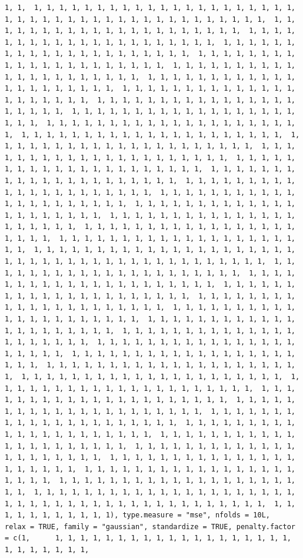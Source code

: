 \documentclass[
]{article}
\begin{document}
\begin{verbatim}
1, 1,  1, 1, 1, 1, 1, 1, 1, 1, 1, 1, 1, 1, 1, 1, 1, 1, 1, 1, 1, 1, 1,  1, 1, 1, 1, 1, 1, 1, 1, 1, 1, 1, 1, 1, 1, 1, 1, 1, 1, 1, 1, 1,  1, 1, 1, 1, 1, 1, 1, 1, 1, 1, 1, 1, 1, 1, 1, 1, 1, 1, 1, 1, 1,  1, 1, 1, 1, 1, 1, 1, 1, 1, 1, 1, 1, 1, 1, 1, 1, 1, 1, 1, 1, 1,  1, 1, 1, 1, 1, 1, 1, 1, 1, 1, 1, 1, 1, 1, 1, 1, 1, 1, 1, 1, 1,  1, 1, 1, 1, 1, 1, 1, 1, 1, 1, 1, 1, 1, 1, 1, 1, 1, 1, 1, 1, 1,  1, 1, 1, 1, 1, 1, 1, 1, 1, 1, 1, 1, 1, 1, 1, 1, 1, 1, 1, 1, 1,  1, 1, 1, 1, 1, 1, 1, 1, 1, 1, 1, 1, 1, 1, 1, 1, 1, 1, 1, 1, 1,  1, 1, 1, 1, 1, 1, 1, 1, 1, 1, 1, 1, 1, 1, 1, 1, 1, 1, 1, 1, 1,  1, 1, 1, 1, 1, 1, 1, 1, 1, 1, 1, 1, 1, 1, 1, 1, 1, 1, 1, 1, 1,  1, 1, 1, 1, 1, 1, 1, 1, 1, 1, 1, 1, 1, 1, 1, 1, 1, 1, 1, 1, 1,  1, 1, 1, 1, 1, 1, 1, 1, 1, 1, 1, 1, 1, 1, 1, 1, 1, 1, 1, 1, 1,  1, 1, 1, 1, 1, 1, 1, 1, 1, 1, 1, 1, 1, 1, 1, 1, 1, 1, 1, 1, 1,  1, 1, 1, 1, 1, 1, 1, 1, 1, 1, 1, 1, 1, 1, 1, 1, 1, 1, 1, 1, 1,  1, 1, 1, 1, 1, 1, 1, 1, 1, 1, 1, 1, 1, 1, 1, 1, 1, 1, 1, 1, 1,  1, 1, 1, 1, 1, 1, 1, 1, 1, 1, 1, 1, 1, 1, 1, 1, 1, 1, 1, 1, 1,  1, 1, 1, 1, 1, 1, 1, 1, 1, 1, 1, 1, 1, 1, 1, 1, 1, 1, 1, 1, 1,  1, 1, 1, 1, 1, 1, 1, 1, 1, 1, 1, 1, 1, 1, 1, 1, 1, 1, 1, 1, 1,  1, 1, 1, 1, 1, 1, 1, 1, 1, 1, 1, 1, 1, 1, 1, 1, 1, 1, 1, 1, 1,  1, 1, 1, 1, 1, 1, 1, 1, 1, 1, 1, 1, 1, 1, 1, 1, 1, 1, 1, 1, 1,  1, 1, 1, 1, 1, 1, 1, 1, 1, 1, 1, 1, 1, 1, 1, 1, 1, 1, 1, 1, 1,  1, 1, 1, 1, 1, 1, 1, 1, 1, 1, 1, 1, 1, 1, 1, 1, 1, 1, 1, 1, 1,  1, 1, 1, 1, 1, 1, 1, 1, 1, 1, 1, 1, 1, 1, 1, 1, 1, 1, 1, 1, 1,  1, 1, 1, 1, 1, 1, 1, 1, 1, 1, 1, 1, 1, 1, 1, 1, 1, 1, 1, 1, 1,  1, 1, 1, 1, 1, 1, 1, 1, 1, 1, 1, 1, 1, 1, 1, 1, 1, 1, 1, 1, 1,  1, 1, 1, 1, 1, 1, 1, 1, 1, 1, 1, 1, 1, 1, 1, 1, 1, 1, 1, 1, 1,  1, 1, 1, 1, 1, 1, 1, 1, 1, 1, 1, 1, 1, 1, 1, 1, 1, 1, 1, 1, 1,  1, 1, 1, 1, 1, 1, 1, 1, 1, 1, 1, 1, 1, 1, 1, 1, 1, 1, 1, 1, 1,  1, 1, 1, 1, 1, 1, 1, 1, 1, 1, 1, 1, 1, 1, 1, 1, 1, 1, 1, 1, 1,  1, 1, 1, 1, 1, 1, 1, 1, 1, 1, 1, 1, 1, 1, 1, 1, 1, 1, 1, 1, 1,  1, 1, 1, 1, 1, 1, 1, 1, 1, 1, 1, 1, 1, 1, 1, 1, 1, 1, 1, 1, 1,  1, 1, 1, 1, 1, 1, 1, 1, 1, 1, 1, 1, 1, 1, 1, 1, 1, 1, 1, 1, 1,  1, 1, 1, 1, 1, 1, 1, 1, 1, 1, 1, 1, 1, 1, 1, 1, 1, 1, 1, 1, 1,  1, 1, 1, 1, 1, 1, 1, 1, 1, 1, 1, 1, 1, 1, 1, 1, 1, 1, 1, 1, 1,  1, 1, 1, 1, 1, 1, 1, 1, 1, 1, 1, 1, 1, 1, 1, 1, 1, 1, 1, 1, 1,  1, 1, 1, 1, 1, 1, 1, 1, 1, 1, 1, 1, 1, 1, 1, 1, 1, 1, 1, 1, 1,  1, 1, 1, 1, 1, 1, 1, 1, 1, 1, 1, 1, 1, 1, 1, 1, 1, 1, 1, 1, 1,  1, 1, 1, 1, 1, 1, 1, 1, 1, 1, 1, 1, 1, 1, 1, 1, 1, 1, 1, 1, 1,  1, 1, 1, 1, 1, 1, 1, 1, 1, 1, 1, 1, 1, 1, 1, 1, 1, 1, 1, 1, 1,  1, 1, 1, 1, 1, 1, 1, 1, 1, 1, 1, 1, 1, 1, 1, 1, 1, 1, 1, 1, 1,  1, 1, 1, 1, 1, 1, 1, 1, 1, 1, 1, 1, 1, 1, 1, 1, 1, 1, 1, 1, 1,  1, 1, 1, 1, 1, 1, 1, 1, 1, 1, 1, 1, 1, 1, 1, 1, 1, 1, 1, 1, 1,  1, 1, 1, 1, 1, 1, 1, 1, 1, 1, 1, 1, 1, 1, 1, 1, 1, 1, 1, 1, 1,  1, 1, 1, 1, 1, 1, 1, 1, 1, 1, 1, 1, 1, 1, 1, 1, 1, 1, 1, 1, 1,  1, 1, 1, 1, 1, 1, 1, 1, 1, 1, 1, 1, 1, 1, 1, 1, 1, 1, 1, 1, 1,  1, 1, 1, 1, 1, 1, 1, 1, 1, 1, 1, 1, 1, 1, 1, 1, 1, 1, 1, 1, 1,  1, 1, 1, 1, 1, 1, 1, 1, 1, 1, 1, 1, 1, 1, 1, 1, 1, 1, 1, 1, 1,  1, 1, 1, 1, 1, 1, 1, 1, 1, 1, 1, 1, 1, 1, 1, 1, 1, 1, 1, 1, 1,  1, 1, 1, 1, 1, 1, 1, 1, 1, 1, 1), type.measure = "mse", nfolds = 10L,      relax = TRUE, family = "gaussian", standardize = TRUE, penalty.factor = c(1,      1, 1, 1, 1, 1, 1, 1, 1, 1, 1, 1, 1, 1, 1, 1, 1, 1, 1, 1,      1, 1, 1, 1, 1, 1, 1, 
\end{verbatim}
\end{document}
